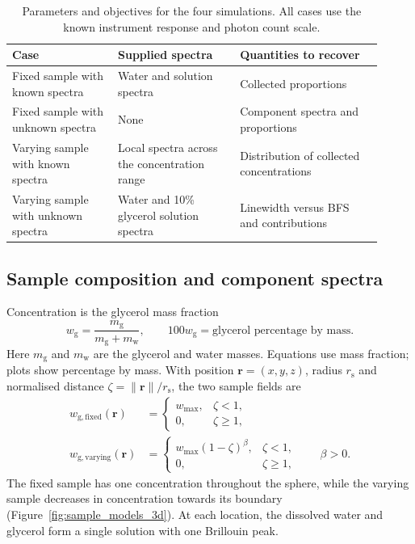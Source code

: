 \documentclass[11pt]{article}
\newcommand{\wg}{w_{\mathrm g}}
\newcommand{\wmax}{w_{\max}}
\begin{document}
\begin{table}[htbp]
\centering\small
\caption{Parameters and objectives for the four simulations. All cases use the known instrument response and photon count scale.}
\label{tab:configurations}
\begin{tabular}{@{}p{0.26\linewidth}p{0.30\linewidth}p{0.35\linewidth}@{}}
\toprule \textbf{Case} & \textbf{Supplied spectra} & \textbf{Quantities to recover} \\ \midrule
Fixed sample with known spectra & Water and solution spectra & Collected proportions \\
Fixed sample with unknown spectra & None & Component spectra and proportions \\
Varying sample with known spectra & Local spectra across the concentration range & Distribution of collected concentrations \\
Varying sample with unknown spectra & Water and 10\% glycerol solution spectra & Linewidth versus BFS and contributions \\
\bottomrule
\end{tabular}
\end{table}

\subsection{Sample composition and component spectra}
\label{sec:response}

Concentration is the glycerol mass fraction
\begin{equation}
 \wg=\frac{m_{\mathrm g}}{m_{\mathrm g}+m_{\mathrm w}},\qquad
 100\wg=\text{glycerol percentage by mass}.
 \label{eq:glycerol_fraction}
\end{equation}
Here $m_{\mathrm g}$ and $m_{\mathrm w}$ are the glycerol and water masses. Equations use mass fraction; plots show percentage by mass. With position $\mathbf r=(x,y,z)$, radius $r_{\mathrm s}$ and normalised distance $\zeta=\|\mathbf r\|/r_{\mathrm s}$, the two sample fields are
\begin{align}
 w_{\mathrm{g,fixed}}(\mathbf r)&=\begin{cases}\wmax,&\zeta<1,\\0,&\zeta\geq1,\end{cases}\\
 w_{\mathrm{g,varying}}(\mathbf r)&=\begin{cases}\wmax(1-\zeta)^\beta,&\zeta<1,\\0,&\zeta\geq1,\end{cases}\qquad\beta>0.
 \label{eq:concentration_profile}
\end{align}
The fixed sample has one concentration throughout the sphere, while the varying sample decreases in concentration towards its boundary (Figure~\ref{fig:sample_models_3d}). At each location, the dissolved water and glycerol form a single solution with one Brillouin peak.
\end{document}
